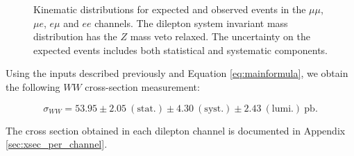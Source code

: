 \begin{figure}[!hbtp]
\begin{center}
\caption{Kinematic distributions for expected and observed events in the  $\mu\mu$, $\mu{e}$, $e\mu$ and $ee$ channels.
The dilepton system invariant mass distribution has the $Z$ mass veto relaxed.
The uncertainty on the expected events includes both statistical and systematic components.}
\label{fig:inclplots}
\end{center}
\end{figure}


Using the inputs described previously and Equation \ref{eq:mainformula},
we obtain the following $WW$ cross-section measurement:

\begin{equation*}
\sigma_{WW}  = 53.95 \pm 2.05~\mathrm{(stat.)} \pm 4.30~\mathrm{(syst.)} \pm 2.43~\mathrm{(lumi.)~pb}.
\end{equation*}

The cross section obtained in each dilepton channel is documented in Appendix \ref{sec:xsec_per_channel}.

